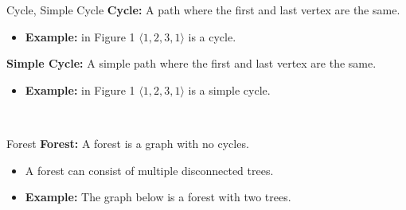 \documentclass{beamer}
\begin{document}
\begin{frame}{Cycle, Simple Cycle}
    \textbf{Cycle:} A path where the first and last vertex are the same.
    \begin{itemize}
        \item \textbf{Example:} in Figure 1 $\langle 1, 2, 3, 1 \rangle$ is a cycle.
    \end{itemize}

    \textbf{Simple Cycle:} A simple path where the first and last vertex are the same.
    \begin{itemize}
        \item \textbf{Example:} in Figure 1 $\langle 1, 2, 3, 1 \rangle$ is a simple cycle.
    \end{itemize}\
\end{frame}

\begin{frame}{Forest}
    \textbf{Forest:} A forest is a graph with no cycles.
    \begin{itemize}
        \item A forest can consist of multiple disconnected trees.
        \item \textbf{Example:} The graph below is a forest with two trees.
    \end{itemize}

    \centering
\end{frame}
\end{document}
